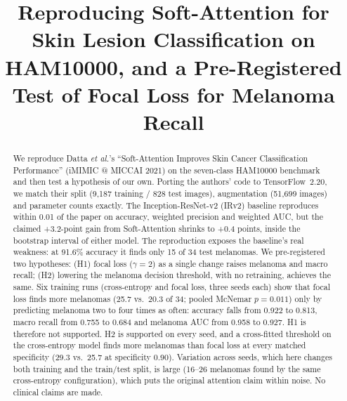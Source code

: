 \documentclass[conference]{IEEEtran}
\begin{document}
\title{Reproducing Soft-Attention for Skin Lesion Classification on HAM10000, and a Pre-Registered Test of Focal Loss for Melanoma Recall}

\author{
\and
{}
}

\maketitle

\begin{abstract}
We reproduce Datta \emph{et al.}'s ``Soft-Attention Improves Skin Cancer Classification Performance'' (iMIMIC @ MICCAI 2021) on the seven-class HAM10000 benchmark and then test a hypothesis of our own. Porting the authors' code to TensorFlow~2.20, we match their split (9,187 training / 828 test images), augmentation (51,699 images) and parameter counts exactly. The Inception-ResNet-v2 (IRv2) baseline reproduces within 0.01 of the paper on accuracy, weighted precision and weighted AUC, but the claimed +3.2-point gain from Soft-Attention shrinks to +0.4 points, inside the bootstrap interval of either model. The reproduction exposes the baseline's real weakness: at 91.6\% accuracy it finds only 15 of 34 test melanomas. We pre-registered two hypotheses: (H1) focal loss ($\gamma=2$) as a single change raises melanoma and macro recall; (H2) lowering the melanoma decision threshold, with no retraining, achieves the same. Six training runs (cross-entropy and focal loss, three seeds each) show that focal loss finds more melanomas (25.7 vs.\ 20.3 of 34; pooled McNemar $p=0.011$) only by predicting melanoma two to four times as often: accuracy falls from 0.922 to 0.813, macro recall from 0.755 to 0.684 and melanoma AUC from 0.958 to 0.927. H1 is therefore not supported. H2 is supported on every seed, and a cross-fitted threshold on the cross-entropy model finds more melanomas than focal loss at every matched specificity (29.3 vs.\ 25.7 at specificity 0.90). Variation across seeds, which here changes both training and the train/test split, is large (16--26 melanomas found by the same cross-entropy configuration), which puts the original attention claim within noise. No clinical claims are made.
\end{abstract}
\end{document}
